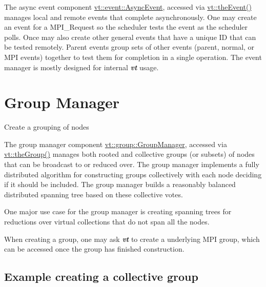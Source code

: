 The async event component {\ttfamily \hyperlink{structvt_1_1event_1_1_async_event}{vt\+::event\+::\+Async\+Event}}, accessed via {\ttfamily \hyperlink{namespacevt_aa297fcaadc8a330890eb90c5b0081ec5}{vt\+::the\+Event()}} manages local and remote events that complete asynchronously. One may create an event for a {\ttfamily M\+P\+I\+\_\+\+Request} so the scheduler tests the event as the scheduler polls. Once may also create other general events that have a unique ID that can be tested remotely. Parent events group sets of other events (parent, normal, or M\+PI events) together to test them for completion in a single operation. The event manager is mostly designed for internal {\bfseries {\itshape vt}} usage. \hypertarget{group}{}\section{Group Manager}\label{group}
Create a grouping of nodes

The group manager component {\ttfamily \hyperlink{structvt_1_1group_1_1_group_manager}{vt\+::group\+::\+Group\+Manager}}, accessed via {\ttfamily \hyperlink{namespacevt_a4548473dce44fb654400009e2b2fe64e}{vt\+::the\+Group()}} manages both rooted and collective groups (or subsets) of nodes that can be broadcast to or reduced over. The group manager implements a fully distributed algorithm for constructing groups collectively with each node deciding if it should be included. The group manager builds a reasonably balanced distributed spanning tree based on these collective votes.

One major use case for the group manager is creating spanning trees for reductions over virtual collections that do not span all the nodes.

When creating a group, one may ask {\bfseries {\itshape vt}} to create a underlying M\+PI group, which can be accessed once the group has finished construction.\hypertarget{group_collective-group-example}{}\subsection{Example creating a collective group}\label{group_collective-group-example}

